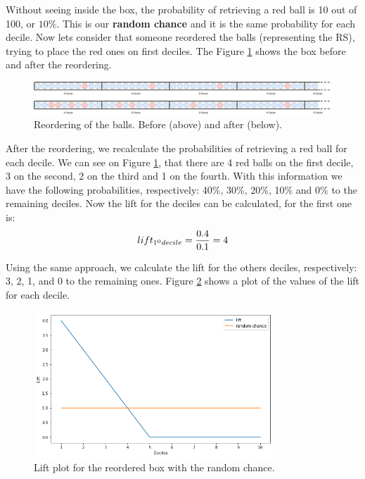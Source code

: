 Without seeing inside the box, the probability of retrieving a red ball is 10 out of 100, or \textbf{$10\%$}. This is our \textbf{random chance} and it is the same probability for each decile. Now lets consider that someone reordered the balls (representing the RS), trying to place the red ones on first deciles. The Figure \ref{fig:rec-box-ordering} shows the box before and after the reordering.

\begin{figure}[h]
   \centering
   \includegraphics[width=\linewidth]{fig/ch2-rec-box-ordering.jpg}
   \caption{Reordering of the balls. Before (above) and after (below).}
   \label{fig:rec-box-ordering}
\end{figure}

After the reordering, we recalculate the probabilities of retrieving a red ball for each decile. We can see on Figure \ref{fig:rec-box-ordering}, that there are 4 red balls on the first decile, 3 on the second, 2 on the third and 1 on the fourth. With this information we have the following probabilities, respectively: 40\%, 30\%, 20\%, 10\% and 0\% to the remaining deciles. Now the lift for the deciles can be calculated, for the first one is:
\begin{equation}
	lift_{1\textsuperscript{o} decile} = \frac{0.4}{0.1} = 4
\end{equation}

Using the same approach, we calculate the lift for the others deciles, respectively: 3, 2, 1, and 0 to the remaining ones. Figure \ref{fig:lift-plot} shows a plot of the values of the lift for each decile.

\begin{figure}[h]
   \centering
   \includegraphics[width=9cm]{fig/ch2-lift-plot.png}
   \caption{Lift plot for the reordered box with the random chance.}
   \label{fig:lift-plot}
\end{figure}

